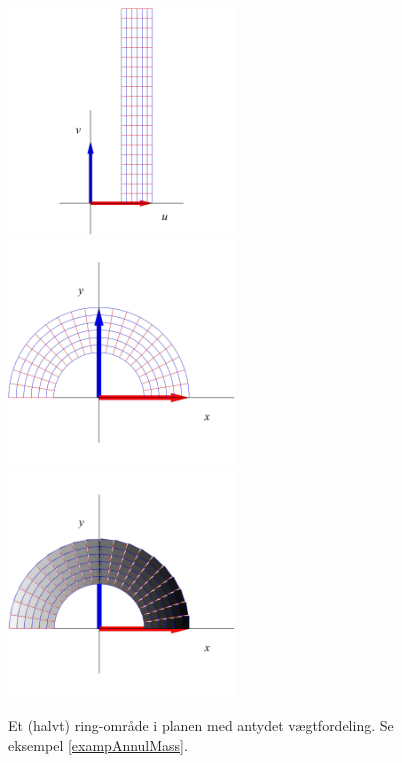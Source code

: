 \begin{figure}[ht]
\centerline{\includegraphics[height=60mm]{FIGS/plotAnnulusM1} \includegraphics[height=60mm]{FIGS/plotAnnulusM2} \includegraphics[height=60mm]{FIGS/plotAnnulusM3}}
\begin{center}
\caption{\small{Et (halvt) ring-område i planen med antydet vægtfordeling. Se
eksempel \ref{exampAnnulMass}. }} \label{figAnnulMass}
\end{center}
\end{figure}












